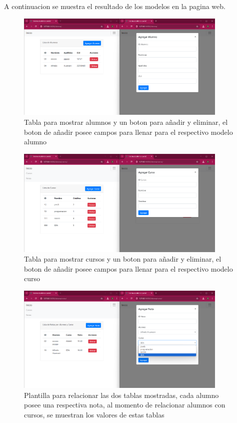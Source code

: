 \documentclass{article}
\begin{document}
    \item A continuacion se muestra el resultado de los modelos en la pagina web.
    
    \begin{figure}[h!]
    \centering
    \includegraphics[width=0.9\textwidth]{img/template1.png}
    \caption{Tabla para mostrar alumnos y un boton para añadir y eliminar, el boton de añadir posee campos para llenar para el respectivo modelo alumno}
\end{figure}

\begin{figure}[h!]
    \centering
    \includegraphics[width=0.9\textwidth]{img/template2.png}
    \caption{Tabla para mostrar cursos y un boton para añadir y eliminar, el boton de añadir posee campos para llenar para el respectivo modelo curso}
\end{figure}

\begin{figure}[h!]
    \centering
    \includegraphics[width=0.9\textwidth]{img/template3.png}
    \caption{Plantilla para relacionar las dos tablas mostradas, cada alumno posee una respectiva nota, al momento de relacionar alumnos con cursos, se muestran los valores de estas tablas}
\end{figure}
\end{document}
